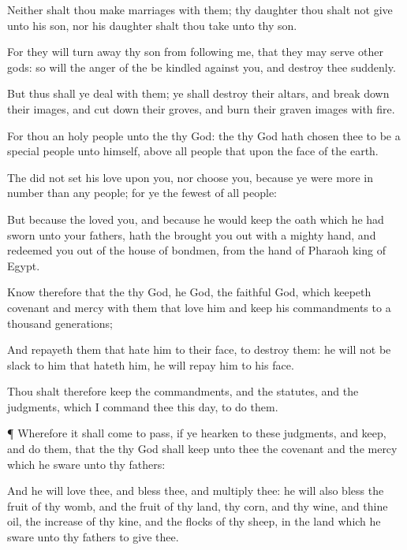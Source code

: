 {Neither shalt thou make
marriages with them; thy
daughter thou shalt not
give unto his
son, nor his
daughter shalt thou
take unto thy
son.

For they will turn
away thy
son from
following me, that they may
serve
other
gods: so will the
anger of the
{} be
kindled against you, and
destroy thee
suddenly.

But thus shall ye
deal with them; ye shall
destroy their
altars, and break
down their
images, and cut
down their
groves, and
burn their graven
images with
fire.

For thou
{} an
holy
people unto the
{} thy
God: the
{} thy
God hath
chosen thee to be a
special
people unto himself, above all
people that
{} upon the
face of the
earth.

The
{} did not set his
love upon you, nor
choose you, because ye were
more in number than any
people; for ye
{} the
fewest of all
people:

But because the
{}
loved you, and because he would
keep the
oath which he had
sworn unto your
fathers, hath the
{} brought you
out with a
mighty
hand, and
redeemed you out of the
house of
bondmen, from the
hand of
Pharaoh
king of
Egypt.

Know therefore that the
{} thy
God, he
{}
God, the
faithful
God, which
keepeth
covenant and
mercy with them that
love him and
keep his
commandments to a
thousand
generations;

And
repayeth them that
hate him to their
face, to
destroy them: he will not be
slack to him that
hateth him, he will
repay him to his
face.

Thou shalt therefore
keep the
commandments, and the
statutes, and the
judgments, which I
command thee this
day, to
do them.


\par }{\PP {}¶ Wherefore it shall come to pass,
if ye
hearken to these
judgments, and
keep, and
do them, that the
{} thy
God shall
keep unto thee the
covenant and the
mercy which he
sware unto thy
fathers:

And he will
love thee, and
bless thee, and
multiply thee: he will also
bless the
fruit of thy
womb, and the
fruit of thy
land, thy
corn, and thy
wine, and thine
oil, the
increase of thy
kine, and the
flocks of thy
sheep, in the
land which he
sware unto thy
fathers to
give thee.

}
